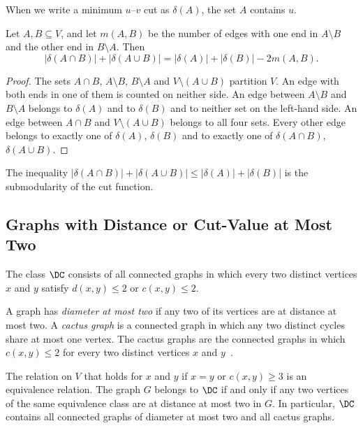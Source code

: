 When we write a minimum $u$--$v$ cut as $\delta(A)$, the set $A$ contains $u$.

\begin{lemma}
\label{lem:uncrossing}
Let $A, B \subseteq V$, and let $m(A, B)$ be the number of edges with one end in $A \setminus B$ and the other end in $B \setminus A$.
Then
\[
|\delta(A \cap B)| + |\delta(A \cup B)| = |\delta(A)| + |\delta(B)| - 2m(A, B).
\]
\end{lemma}

\begin{proof}
The sets $A \cap B$, $A \setminus B$, $B \setminus A$ and $V \setminus (A \cup B)$ partition $V$.
An edge with both ends in one of them is counted on neither side.
An edge between $A \setminus B$ and $B \setminus A$ belongs to $\delta(A)$ and to $\delta(B)$ and to neither set on the left-hand side.
An edge between $A \cap B$ and $V \setminus (A \cup B)$ belongs to all four sets.
Every other edge belongs to exactly one of $\delta(A)$, $\delta(B)$ and to exactly one of $\delta(A \cap B)$, $\delta(A \cup B)$.
\end{proof}

The inequality $|\delta(A \cap B)| + |\delta(A \cup B)| \leq |\delta(A)| + |\delta(B)|$ is the submodularity of the cut function.

\subsection{Graphs with Distance or Cut-Value at Most Two}
\label{sec:class}

\begin{definition}
\label{def:class}
The class $\DC$ consists of all connected graphs in which every two distinct vertices $x$ and $y$ satisfy $d(x, y) \leq 2$ or $c(x, y) \leq 2$.
\end{definition}

A graph has \emph{diameter at most two} if any two of its vertices are at distance at most two.
A \emph{cactus graph} is a connected graph in which any two distinct cycles share at most one vertex.
The cactus graphs are the connected graphs in which $c(x, y) \leq 2$ for every two distinct vertices $x$ and $y$~\cite[Lemma~6.1]{Michel2026MinCutPath}.

\begin{proposition}
\label{prop:class}
The relation on $V$ that holds for $x$ and $y$ if $x = y$ or $c(x, y) \geq 3$ is an equivalence relation.
The graph $G$ belongs to $\DC$ if and only if any two vertices of the same equivalence class are at distance at most two in $G$.
In particular, $\DC$ contains all connected graphs of diameter at most two and all cactus graphs.
\end{proposition}

